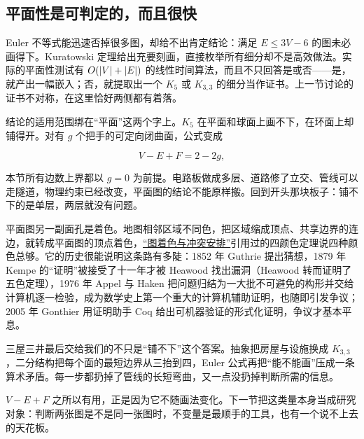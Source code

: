 \subsection{平面性是可判定的，而且很快}

Euler 不等式能迅速否掉很多图，却给不出肯定结论：满足 \(E\le 3V-6\) 的图未必画得下。Kuratowski 定理给出充要刻画，直接枚举所有细分却不是高效做法。实际的平面性测试有 \(O(\left|V\right|+\left|E\right|)\) 的线性时间算法，而且不只回答是或否——是，就产出一幅嵌入；否，就提取出一个 \(K_5\) 或 \(K_{3,3}\) 的细分当作证书。上一节讨论的证书不对称，在这里恰好两侧都有着落。

结论的适用范围绑在``平面''这两个字上。\(K_5\) 在平面和球面上画不下，在环面上却铺得开。对有 \(g\) 个把手的可定向闭曲面，公式变成

\[
V-E+F=2-2g,
\]

本节所有边数上界都以 \(g=0\) 为前提。电路板做成多层、道路修了立交、管线可以走隧道，物理约束已经改变，平面图的结论不能原样搬。回到开头那块板子：铺不下的是单层，两层就没有问题。

平面图另一副面孔是着色。地图相邻区域不同色，把区域缩成顶点、共享边界的连边，就转成平面图的顶点着色，\hyperref[sec:04-Discrete-Mathematics/03-Graph-Theory/05]{``图着色与冲突安排''}引用过的四颜色定理说四种颜色总够。它的历史很能说明这条路有多陡：1852 年 Guthrie 提出猜想，1879 年 Kempe 的``证明''被接受了十一年才被 Heawood 找出漏洞（Heawood 转而证明了五色定理），1976 年 Appel 与 Haken 把问题归结为一大批不可避免的构形并交给计算机逐一检验，成为数学史上第一个重大的计算机辅助证明，也随即引发争议；2005 年 Gonthier 用证明助手 Coq 给出可机器验证的形式化证明，争议才基本平息。

三屋三井最后交给我们的不只是``铺不下''这个答案。抽象把房屋与设施换成 \(K_{3,3}\)，二分结构把每个面的最短边界从三抬到四，Euler 公式再把``能不能画''压成一条算术矛盾。每一步都扔掉了管线的长短弯曲，又一点没扔掉判断所需的信息。

\(V-E+F\) 之所以有用，正是因为它不随画法变化。下一节把这类量本身当成研究对象：判断两张图是不是同一张图时，不变量是最顺手的工具，也有一个说不上去的天花板。
